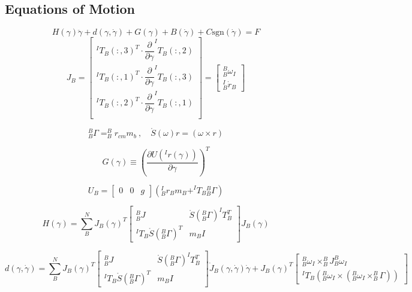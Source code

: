 \documentclass[12pt]{report}
\begin{document}
\subsection{Equations of Motion}
\begin{equation}
  H(\gamma)\ddot{\gamma}+d(\gamma,\dot{\gamma})+G(\gamma)+B(\dot{\gamma})+C\text{sgn}(\dot{\gamma}) = F
  \label{eq:dynamics}
\end{equation}
\[
J_B =
\begin{bmatrix}
  ^IT_B(:,3)^T \cdot \dfrac{\partial}{\partial\gamma}^IT_B(:,2) \\
  ^IT_B(:,1)^T \cdot \dfrac{\partial}{\partial\gamma}^IT_B(:,3) \\
  ^IT_B(:,2)^T \cdot \dfrac{\partial}{\partial\gamma}^IT_B(:,1) \\
\end{bmatrix}
=
\begin{bmatrix}
  ^B_B\omega_I\\
  ^I_B\dot{r}_B
\end{bmatrix}
\]

\[
^B_B\Gamma = ^B_Br_{cm}m_b~,\quad \mathring{S}(\omega)r=(\omega\times r)
\]

\[
G(\gamma) \equiv \left(\frac{\partial U(^Ir(\gamma))}{\partial\gamma}\right)^T
\]

\[
U_B = \begin{bmatrix} 0 & 0 & g\end{bmatrix}\left(^I_Br_Bm_B + ^IT_B{}_B^B\Gamma\right)
\]

\begin{equation}
  \renewcommand{\arraystretch}{1.5}
  H(\gamma) = \sum_B^N J_B(\gamma)^T
  \begin{bmatrix}
    ^B_BJ & \mathring{S}(^B_B\Gamma) ^IT_B^T\\
    ^IT_B\mathring{S}(^B_B\Gamma)^T & m_BI
  \end{bmatrix}
  J_B(\gamma)
\end{equation}

\begin{equation}
  \renewcommand{\arraystretch}{1.5}
  d(\gamma,\dot{\gamma}) = \sum_B^N J_B(\gamma)^T
  \begin{bmatrix}
    ^B_BJ & \mathring{S}(^B_B\Gamma) ^IT_B^T\\
    ^IT_B\mathring{S}(^B_B\Gamma)^T & m_BI
  \end{bmatrix}
  \dot{J}_B(\gamma,\dot{\gamma})\dot{\gamma}+J_B(\gamma)^T
  \begin{bmatrix}
    ^B_B\omega_I \times ^B_BJ ^B_B\omega_I \\
    ^IT_B\left(^B_B\omega_I\times(^B_B\omega_I\times^B_B\Gamma)\right)
  \end{bmatrix}
\end{equation}
\newpage
\end{document}
